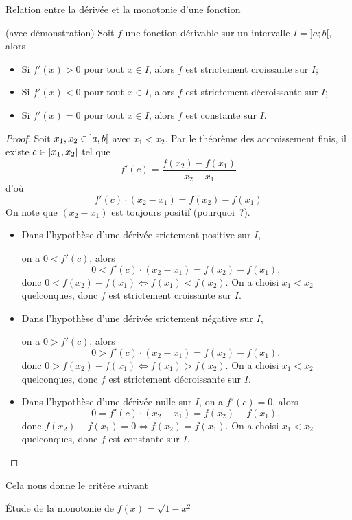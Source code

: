 \documentclass[a4paper,12pt]{article}
\begin{document}
\begin{thm}
	Relation entre la dérivée et la monotonie d'une fonction

	(avec démonstration)
	\tcblower
	Soit $f$ une fonction dérivable sur un intervalle $I=]a;b[$, alors  
	\begin{itemize}
		\item Si $f'(x)>0$ pour tout $x\in I$, alors $f$ est strictement croissante sur $I$;
		\item Si $f'(x)<0$ pour tout $x\in I$, alors $f$ est strictement décroissante sur $I$;
		\item Si $f'(x)=0$ pour tout $x\in I$, alors $f$ est constante sur $I$.
	\end{itemize}
	\begin{proof}
		Soit $x_1,x_2\in \ointerval{a}{b}$ avec $x_1<x_2$. Par le théorème des accroissement finis, il existe $c\in\ointerval{x_1}{x_2}$ tel que 
		\[f'(c)=\dfrac{f(x_2)-f(x_1)}{x_2-x_1}\]
		d'où
		\[f'(c)\cdot (x_2-x_1)=f(x_2)-f(x_1)\]
		On note que $(x_2-x_1)$ est toujours positif (pourquoi~?).
		\begin{itemize}
			\item Dans l'hypothèse d'une dérivée srictement positive sur $I$,

				on a $0<f'(c)$, alors 
				\[0<f'(c)\cdot (x_2-x_1)=f(x_2)-f(x_1),\]
				donc $0<f(x_2)-f(x_1) \iff f(x_1)<f(x_2)$. On a choisi $x_1<x_2$ quelconques, donc $f$ est strictement croissante sur $I$. 
			\item Dans l'hypothèse d'une dérivée srictement négative sur $I$, 

				on a $0>f'(c)$, alors 
				\[0>f'(c)\cdot (x_2-x_1)=f(x_2)-f(x_1),\]
				donc $0>f(x_2)-f(x_1) \iff f(x_1)>f(x_2)$. On a choisi $x_1<x_2$ quelconques, donc $f$ est strictement décroissante sur $I$. 
			\item Dans l'hypothèse d'une dérivée nulle sur $I$, on a $f'(c)=0$, alors 
				\[0=f'(c)\cdot (x_2-x_1)=f(x_2)-f(x_1),\]
				donc $f(x_2)-f(x_1)=0 \iff f(x_2)=f(x_1)$. On a choisi $x_1<x_2$ quelconques, donc $f$ est constante sur $I$. 
		\end{itemize}

	\end{proof}
\end{thm}
\begin{formule}
	\tcblower
	Cela nous donne le critère suivant 
\end{formule}
\begin{exemple}
	\tcblower
	Étude de la monotonie de $f(x)=\sqrt{1-x^2}$
	\vspace{6cm}	
\end{exemple}
\end{document}
